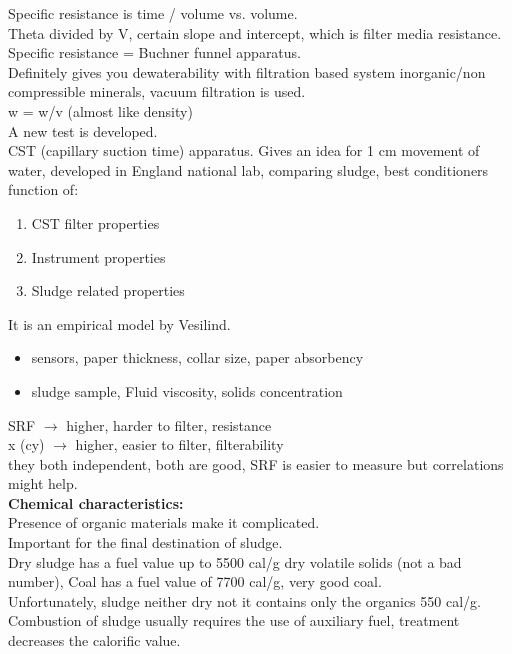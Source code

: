 \documentclass[12pt]{article}
\begin{document}
Specific resistance is  time / volume vs. volume.\\
Theta divided by V, certain slope and intercept, which is filter media resistance.\\ %
Specific resistance = Buchner funnel apparatus.\\
Definitely gives you dewaterability with filtration based system
inorganic/non compressible minerals, vacuum filtration is used.\\
w = w/v (almost like density)\\%
A new test is developed.\\
CST (capillary suction time) apparatus.
Gives an idea for 1 cm movement of water, developed in England
national lab, comparing sludge, best conditioners
function of:
\begin{enumerate}
    \item CST filter properties
    \item Instrument properties
    \item Sludge related properties
\end{enumerate}
It is an empirical model by Vesilind. %
\begin{itemize}
    \item sensors, paper thickness, collar size, paper absorbency
    \item sludge sample, Fluid viscosity, solids concentration
\end{itemize}
SRF $\rightarrow$ higher, harder to filter, resistance\\
x (cy) $\rightarrow$ higher, easier to filter, filterability\\ %
they both independent, both are good, SRF is easier to measure but correlations might help.\\
\textbf{Chemical characteristics:}\\
Presence of organic materials make it complicated.\\
Important for the final destination of sludge.\\
Dry sludge has a fuel value up to 5500 cal/g dry volatile solids (not a bad number), Coal has a fuel value of 7700 cal/g, very good coal.\\
Unfortunately, sludge neither dry not it contains only the organics 550 cal/g.\\
Combustion of sludge usually requires the use of auxiliary fuel, treatment decreases the calorific value.\\
\end{document}
